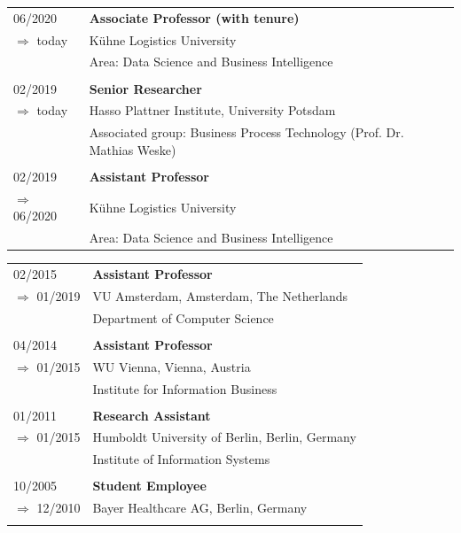 \documentclass[titlepage]{article}
\begin{document}
\raggedright
\begin{tabular}{P{3cm}P{12cm}}
06/2020														& \textbf{Associate Professor (with tenure)} \\
\hspace*{0.4cm}$\Rightarrow$ today			&  Kühne Logistics University \\
																	& Area:  Data Science and Business Intelligence\\
																	\\																
02/2019														& \textbf{Senior Researcher} \\
\hspace*{0.4cm}$\Rightarrow$ today			& Hasso Plattner Institute, University Potsdam   \\
																	& Associated group: Business Process Technology (Prof. Dr. Mathias Weske) \\
																	\\																	
02/2019														& \textbf{Assistant Professor} \\
\hspace*{0.4cm}$\Rightarrow$ 06/2020	&  Kühne Logistics University \\
																	& Area:  Data Science and Business Intelligence\\
\end{tabular}
\raggedright
\begin{tabular}{P{3cm}P{12cm}}																	
02/2015   													& \textbf{Assistant Professor} \\
\hspace*{0.4cm}$\Rightarrow$  01/2019	& VU Amsterdam, Amsterdam, The Netherlands \\
																	& Department of Computer Science\\
																	\\
04/2014   													& \textbf{Assistant Professor} \\
\hspace*{0.4cm}$\Rightarrow$  01/2015	& WU Vienna, Vienna, Austria \\
																	& Institute for Information Business \\
																	\\
01/2011   													& \textbf{Research Assistant} \\
\hspace*{0.4cm}$\Rightarrow$  01/2015	& Humboldt University of Berlin, Berlin, Germany \\
																	& Institute of Information Systems \\
																	\\
10/2005   													& \textbf{Student Employee} \\
\hspace*{0.4cm}$\Rightarrow$  12/2010	& Bayer Healthcare AG, Berlin, Germany  \\
																	\\																	
\end{tabular}
\end{document}
